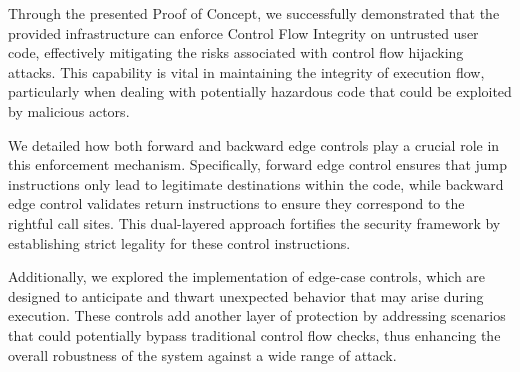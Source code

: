 Through the presented Proof of Concept, we successfully demonstrated that the provided
infrastructure can enforce Control Flow Integrity on untrusted user code,
effectively mitigating the risks associated with control flow hijacking attacks.
This capability is vital in maintaining the integrity of execution flow,
particularly when dealing with potentially hazardous code that could be
exploited by malicious actors.

We detailed how both forward and backward edge controls play a crucial role in
this enforcement mechanism. Specifically, forward edge control ensures that jump
instructions only lead to legitimate destinations within the code, while backward
edge control validates return instructions to ensure they correspond to the rightful
call sites. This dual-layered approach fortifies the security framework by
establishing strict legality for these control instructions.

Additionally, we explored the implementation of edge-case controls, which are
designed to anticipate and thwart unexpected behavior that may arise during
execution. These controls add another layer of protection by addressing scenarios
that could potentially bypass traditional control flow checks, thus enhancing
the overall robustness of the system against a wide range of attack.